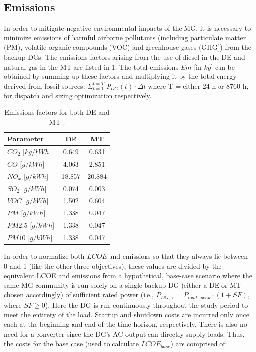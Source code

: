 \documentclass[final,3p,times]{elsarticle}
\begin{document}
\subsection{Emissions \label{sec:norm}}
In order to mitigate negative environmental impacts of the MG, it is necessary to minimize emissions of harmful airborne pollutants (including particulate matter (PM), volatile organic compounds (VOC) and greenhouse gases (GHG)) from the backup DGs. The emissions factors arising from the use of diesel in the DE and natural gas in the MT are listed in \cref{tab:emissions}. The total emissions $Em$ [in $kg$] can be obtained by summing up these factors and multiplying it by the total energy derived from fossil sources: $\Sigma_{t=1}^{t=T} \; P_{DG}(t) \cdot \Delta t$ where T = either 24 h or 8760 h, for dispatch and sizing optimization respectively.

\begin{table}[htbp]
\centering
\begin{tabular}{@{}lcc@{}}
\toprule
\textbf{Parameter} & DE & MT \\ 
\midrule
$CO_2$ [$kg/kWh$] & 0.649 \cite{wu2016} & 0.631 \cite{chp_mt} \\
$CO$ [$g/kWh$] & 4.063 & 2.851\\
$NO_x$ [$g/kWh$] & 18.857 & 20.884\\
$SO_2$ [$g/kWh$] & 0.074 & 0.003\\
$VOC$ [$g/kWh$] & 1.502 & 0.604\\
$PM$ [$g/kWh$] & 1.338 & 0.047\\
$PM2.5$ [$g/kWh$] & 1.338 & 0.047\\
$PM10$ [$g/kWh$] & 1.338 & 0.047\\
\bottomrule
\end{tabular}
\caption{Emissions factors for both DE and MT \cite{emissions}.}
\label{tab:emissions}
\end{table}

In order to normalize both $LCOE$ and emissions so that they always lie between 0 and 1 (like the other three objectives), these values are divided by the equivalent LCOE and emissions from a hypothetical, base-case scenario where the same MG community is run solely on a single backup DG (either a DE or MT chosen accordingly) of sufficient rated power (i.e., $P_{DG,\;r} = P_{load,\; peak} \cdot (1+SF)$, where $SF \geq 0$). Here the DG is run continuously throughout the study period to meet the entirety of the load. Startup and shutdown costs are incurred only once each at the beginning and end of the time horizon, respectively. There is also no need for a converter since the DG's AC output can directly supply loads. Thus, the costs for the base case (used to calculate $LCOE_{base}$) are comprised of:
\end{document}

